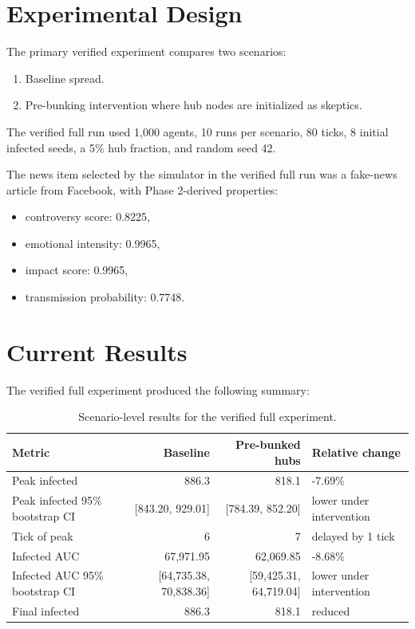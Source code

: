 \documentclass[11pt,a4paper]{article}
\begin{document}
\section{Experimental Design}
The primary verified experiment compares two scenarios:

\begin{enumerate}
  \item Baseline spread.
  \item Pre-bunking intervention where hub nodes are initialized as skeptics.
\end{enumerate}

The verified full run used 1,000 agents, 10 runs per scenario, 80 ticks, 8 initial infected seeds, a 5\% hub fraction, and random seed 42.

The news item selected by the simulator in the verified full run was a fake-news article from Facebook, with Phase 2-derived properties:

\begin{itemize}
  \item controversy score: 0.8225,
  \item emotional intensity: 0.9965,
  \item impact score: 0.9965,
  \item transmission probability: 0.7748.
\end{itemize}

\section{Current Results}
The verified full experiment produced the following summary:

\begin{table}[h]
\centering
\begin{tabularx}{\linewidth}{lrrX}
\toprule
Metric & Baseline & Pre-bunked hubs & Relative change \\
\midrule
Peak infected & 886.3 & 818.1 & -7.69\% \\
Peak infected 95\% bootstrap CI & [843.20, 929.01] & [784.39, 852.20] & lower under intervention \\
Tick of peak & 6 & 7 & delayed by 1 tick \\
Infected AUC & 67,971.95 & 62,069.85 & -8.68\% \\
Infected AUC 95\% bootstrap CI & [64,735.38, 70,838.36] & [59,425.31, 64,719.04] & lower under intervention \\
Final infected & 886.3 & 818.1 & reduced \\
\bottomrule
\end{tabularx}
\caption{Scenario-level results for the verified full experiment.}
\end{table}
\end{document}
